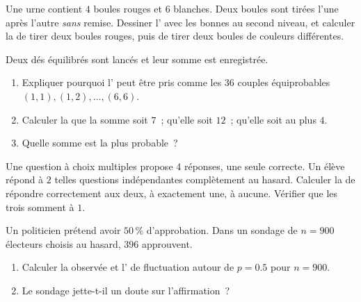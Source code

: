 \begin{exercise}[$\star\star$]\label{exo:g10:proba:5}
Une urne contient $4$ boules rouges et $6$ blanches. Deux boules sont
tirées l'une après l'autre \emph{sans} remise. Dessiner l' avec les
bonnes  au second niveau, et calculer la  de tirer
deux boules rouges, puis de tirer deux boules de couleurs différentes.
\end{exercise}

\begin{exercise}[$\star\star$]\label{exo:g10:proba:6}
Deux dés équilibrés sont lancés et leur somme est enregistrée.
\begin{enumerate}
  \item Expliquer pourquoi l' peut être pris comme les $36$
        couples équiprobables $(1,1), (1,2), \dots, (6,6)$.
  \item Calculer la  que la somme soit $7$~; qu'elle soit
        $12$~; qu'elle soit au plus $4$.
  \item Quelle somme est la plus probable~?
\end{enumerate}
\end{exercise}

\begin{exercise}[$\star\star$]\label{exo:g10:proba:7}
Une question à choix multiples propose $4$ réponses, une seule correcte.
Un élève répond à $2$ telles questions indépendantes complètement au
hasard. Calculer la  de répondre correctement aux deux, à
exactement une, à aucune. Vérifier que les trois  somment à
$1$.
\end{exercise}

\begin{exercise}[$\star\star$]\label{exo:g10:proba:8}
Un politicien prétend avoir $50\,\%$ d'approbation. Dans un sondage de
$n = 900$ électeurs choisis au hasard, $396$ approuvent.
\begin{enumerate}
  \item Calculer la  observée et l' de fluctuation
        autour de $p = 0.5$ pour $n = 900$.
  \item Le sondage jette-t-il un doute sur l'affirmation~?
\end{enumerate}
\end{exercise}

